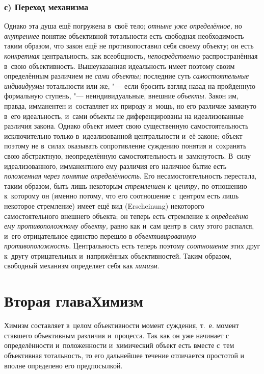 \subsection[с) Переход механизма]{с) Переход механизма}

Однако эта душа ещё погружена в~своё тело;
{\em отныне уже определённое,}
но {\em внутреннее}
понятие объективной тотальности есть свободная необходимость
таким образом, что закон ещё не противопоставил себя своему объекту; он
есть {\em конкретная}
центральность, как всеобщность,
{\em непосредственно}
распространённая в~свою объективность. Вышеуказанная
идеальность имеет поэтому своим определённым различием не
{\em сами объекты;}
последние суть
{\em самостоятельные индивидуумы}
тотальности или же, "--- если бросить взгляд
назад на пройденную формальную ступень, "--- неиндивидуальные,
внешние {\em объекты}.
Закон им, правда, имманентен и~составляет их природу и~мощь,
но его различие замкнуто в~его идеальность, и~сами объекты не
диференцированы на идеализованные различия закона. Однако объект имеет свою
существенную самостоятельность исключительно только в~идеализованной
центральности и~её законе; объект поэтому не в~силах оказывать
сопротивление суждению понятия и~сохранять свою абстрактную, неопределённую
самостоятельность и~замкнутость. В~силу идеализованного, имманентного ему
различия его наличное бытие есть
{\em положенная}
{\em через понятие определённость}.
Его несамостоятельность перестала, таким образом, быть лишь
некоторым {\em стремлением к~центру,}
по отношению к~которому он (именно потому, что его
соотношение с~центром есть лишь некоторое стремление) имеет ещё вид
(Erscheinung) некоторого самостоятельного внешнего объекта;
он теперь есть стремление к
{\em определённо ему противоположному
объекту,} равно как и~сам центр в~силу этого распался, и~его
отрицательное единство перешло в
{\em объективированную
противоположность}. Центральность есть теперь
поэтому
{\em соотношение} этих
друг к~другу отрицательных и~напряжённых объективностей. Таким образом,
свободный механизм определяет себя как
{\em химизм}.

\chapter[Вторая глава Химизм]{Вторая глава\newline Химизм}

Химизм составляет в~целом объективности момент суждения, т.~е.
момент ставшего объективным различия и~процесса. Так как он уже начинает с
определённости и~положенности и~химический объект есть вместе с~тем
объективная тотальность, то его дальнейшее течение отличается простотой и
вполне определено его предпосылкой.

